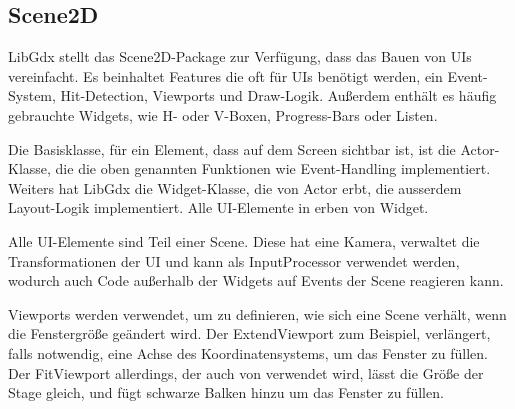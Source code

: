 
\subsection{Scene2D}\label{subsec:scene2D}

\renewcommand{\kapitelautor}{Autor: Marvin Kurka}

LibGdx stellt das Scene2D-Package zur Verfügung, dass das Bauen von UIs vereinfacht.
Es beinhaltet Features die oft für UIs benötigt werden, ein Event-System, Hit-Detection, Viewports und Draw-Logik.
Außerdem enthält es häufig gebrauchte Widgets, wie H- oder V-Boxen, Progress-Bars oder Listen.

Die Basisklasse, für ein Element, dass auf dem Screen sichtbar ist, ist die Actor-Klasse, die die oben genannten
Funktionen wie Event-Handling implementiert.
Weiters hat LibGdx die Widget-Klasse, die von Actor erbt, die ausserdem Layout-Logik implementiert.
Alle UI-Elemente in \FF erben von Widget.

Alle UI-Elemente sind Teil einer Scene.
Diese hat eine Kamera, verwaltet die Transformationen der UI und kann als InputProcessor verwendet werden, wodurch
auch Code außerhalb der Widgets auf Events der Scene reagieren kann.

Viewports werden verwendet, um zu definieren, wie sich eine Scene verhält, wenn die Fenstergröße geändert wird.
Der ExtendViewport zum Beispiel, verlängert, falls notwendig, eine Achse des Koordinatensystems, um das Fenster zu füllen.
Der FitViewport allerdings, der auch von \FF verwendet wird, lässt die Größe der Stage gleich, und fügt schwarze Balken
hinzu um das Fenster zu füllen.


\renewcommand{\kapitelautor}{}
